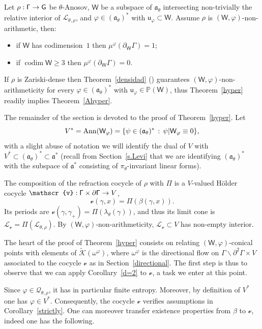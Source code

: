 \documentclass[AHL,Unicode,longabstracts,MathTools]{cedram}
\DeclareMathOperator{\codim}{codim}
\newcommand{\Ann}{\mathrm{Ann}}
\newcommand{\scr}{\mathscr}
\newcommand{\cc}{\scr{v}}
\renewcommand{\sf}[1]{{\mathsf{#1}}}
\newcommand{\sfG}{\sf{G}}
\newcommand{\G}{\sf{\Gamma}}
\newcommand{\cal}{\mathcal}
\newcommand{\calL}{\mathcal{L}}
\newcommand{\calQ}{\mathcal{Q}}
\renewcommand{\P}{\mathbb{P}}
\newcommand{\g}{\gamma}
\renewcommand{\t}{\theta}
\newcommand{\bord}{\partial}
\newcommand{\rfr}{\beta}
\newcommand{\df}{\omega}
\renewcommand{\/}{\backslash}
\newcommand{\<}{\langle}
\renewcommand{\>}{\rangle}
\renewcommand{\a}{\mathfrak{a}}
\renewcommand*{\to}{\mathchoice{\longrightarrow}{\rightarrow}{\rightarrow}{\rightarrow}}
\let\originalleft\left
\let\originalright\right
\renewcommand{\left}{\mathopen{}\mathclose\bgroup\originalleft}
\renewcommand{\right}{\aftergroup\egroup\originalright}
\begin{document}
\begin{theo}\label{hyper}
\label{ps-sandwich}
Let $\rho:\G\to\sfG$ be $\t$-Anosov, $\sf W$ be a subspace of $\a_\t$ intersecting non-trivially the relative interior of $\calL_{\t,\rho}$, and $\varphi\in(\a_\t)^*$ with $\sf u_\varphi\subset \sf W$. Assume $\rho$ is $(\sf W,\varphi)$-non-arithmetic, then:
\begin{itemize}
\item if $\sf W$ has codimension~$1$ then $\mu^\varphi(\bord_\sf W\G)=1;$
\item if $\codim\sf W\geq3$ then $\mu^\varphi(\bord_{\sf W}\G)=0$.
\end{itemize}
\end{theo}

\begin{rema}
If $\rho$ is Zariski-dense then Theorem~\ref{densidad} (\cite{benoist2}) guarantees $(\sf W,\varphi)$-non-arithmeticity for every $\varphi\in(\a_\t)^*$ with $\sf u_\varphi\in\P(\sf W)$, thus Theorem~\ref{hyper} readily implies Theorem~\ref{Ahyper}.
\end{rema}

The remainder of the section is devoted to the proof of Theorem~\ref{hyper}. Let
\[
V^*=\Ann(\sf W_\varphi)=\left\{\psi\in(\a_\t)^*\,:\,\psi|\sf W_\varphi\equiv0\right\},
\]
with a slight abuse of notation we will identify the dual of $V$ with $V^*\subset(\a_\t)^*\subset \a^*$ (recall from Section~\ref{s.Levi} that we are identifying $(\a_\t)^*$ with the subspace of $\a^*$ consisting of $\pi_\t$-invariant linear forms).

The composition of the refraction cocycle of $\rho$ with $\Pi$ is a $V$-valued H\"older cocycle $\cc:\G\times\bord\G\to V$,
\[
\cc(\g,x)=\Pi(\rfr(\g,x)).
\]
Its periods are $\cc(\g,\g_+)=\Pi(\lambda_\t(\g))$, and thus its limit cone is $\calL_\cc=\Pi(\calL_{\t,\rho})$. By $(\sf W,\varphi)$-non-arithmeticity, $\cal L_{\cc}\subset V$ has non-empty interior.


The heart of the proof of Theorem~\ref{hyper} consists on relating $(\sf W,\varphi)$-conical points with elements of $\widetilde{\cal K}(\df^{\varphi})$, where $\df^{\varphi}$ is the directional flow on $\G\/\bord^2\G\times V$ associated to the cocycle $\cc$ as in Section~\ref{directional}. The first step is thus to observe that we can apply Corollary~\ref{d=2} to $\cc$, a task we enter at this point.



Since $\varphi\in\calQ_{\t,\rho}$, it has in particular finite entropy. Moreover, by definition of $V^*$ one has $\varphi\in V^*$. Consequently, the cocycle $\cc$ verifies assumptions in Corollary~\ref{strictly}. One can moreover transfer existence properties from $\rfr$ to $\cc$, indeed one has the following.
\end{document}
